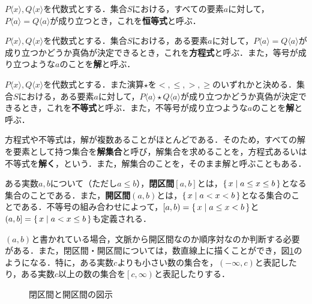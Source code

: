 \begin{definition}[恒等式]
	$P\langle x\rangle, Q\langle x\rangle$を代数式とする．集合$S$における，すべての要素$a$に対して，$P\langle a\rangle = Q\langle a\rangle$が成り立つとき，これを\textbf{恒等式}と呼ぶ．
\end{definition}
\begin{definition}[方程式]
	$P\langle x\rangle, Q\langle x\rangle$を代数式とする．集合$S$における，ある要素$a$に対して，$P\langle a\rangle = Q\langle a\rangle$が成り立つかどうか真偽が決定できるとき，これを\textbf{方程式}と呼ぶ．また，等号が成り立つような$a$のことを\textbf{解}と呼ぶ．
\end{definition}
\begin{definition}[不等式]
	$P\langle x\rangle, Q\langle x\rangle$を代数式とする．また演算$\star$を$<, \leq, >, \geq$のいずれかと決める．集合$S$における，ある要素$a$に対して，$P\langle a\rangle \star Q\langle a\rangle$が成り立つかどうか真偽が決定できるとき，これを\textbf{不等式}と呼ぶ．また，不等号が成り立つような$a$のことを\textbf{解}と呼ぶ．
\end{definition}
\begin{rem*}
	方程式や不等式は，解が複数あることがほとんどである．そのため，すべての解を要素として持つ集合を\textbf{解集合}と呼び，解集合を求めることを，方程式あるいは不等式を\textbf{解く}，という\footnotemark[2]．また，解集合のことを，そのまま解と呼ぶこともある．
\end{rem*}
\begin{definition}
	ある実数$a, b$について（ただし$a \leq b$），\textbf{閉区間}$\left[a, b\right]$とは，$\left\{\,x \mid a \leq x \leq b\,\right\}$となる集合のことである．また，\textbf{開区間}$\left(a, b\right)$とは，$\left\{\,x \mid a < x < b\,\right\}$となる集合のことである．不等号の組み合わせによって，$\left[a, b\right) = \left\{\,x \mid a \leq x < b\,\right\}$と$\left(a, b\right] = \left\{\,x \mid a < x \leq b\,\right\}$も定義される\footnotemark[3]．
\end{definition}
\begin{rem*}
	$\left(a, b\right)$と書かれている場合，文脈から開区間なのか順序対なのか判断する必要がある．また，閉区間・開区間については，数直線上に描くことができ，図\ref{fig:interval}のようになる．特に，ある実数$c$よりも小さい数の集合を，$\left(-\infty, c\right)$と表記したり，ある実数$c$以上の数の集合を$\left[c, \infty\right)$と表記したりする．
	
	\vfill
	\begin{figure}[!h]
		\caption{閉区間と開区間の図示}
		\label{fig:interval}
	\end{figure}
\end{rem*}
\clearpage

